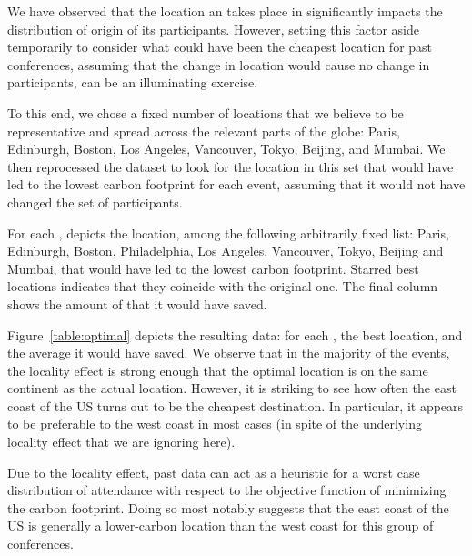 We have observed that the location an \event takes place in significantly
impacts the distribution of origin of its participants. However, setting
this factor aside temporarily to consider what could have been the cheapest
location for past conferences, assuming that the change in location would
cause no change in participants, can be an illuminating exercise.

To this end, we chose a fixed number of locations that we believe to be
representative and spread across the relevant parts of the globe: Paris,
Edinburgh, Boston, Los Angeles, Vancouver, Tokyo, Beijing, and Mumbai. We
then reprocessed the dataset to look for the location in this set that would
have led to the lowest carbon footprint for each event, assuming that it
would not have changed the set of participants.

\begin{table}
    \centering
  \caption{For each \event, depicts the location, among the following arbitrarily fixed list:
    Paris, Edinburgh, Boston, Philadelphia, Los Angeles, Vancouver, Tokyo, Beijing and Mumbai,
    that would have led to the lowest carbon footprint.
    Starred best locations indicates that they coincide with the original one.
    The final column shows the amount
    of \gazunitbis that it would have saved. 
  }
  \label{table:optimal}
\end{table}

Figure~\ref{table:optimal} depicts the resulting data: for each \event, the
best location, and the average \gazunitbis{} it would have saved. We observe
that in the majority of the events, the locality effect is strong enough
that the optimal location is on the same continent as the actual
location. However, it is striking to see how often the east coast of the US
turns out to be the cheapest destination. In particular, it appears to be
preferable to the west coast in most cases (in spite of the underlying
locality effect that we are ignoring here).

\begin{obs}
Due to the locality effect, past data can act as a heuristic for a worst
case distribution of attendance with respect to the objective function of
minimizing the carbon footprint. Doing so most notably suggests that the
east coast of the US is generally a lower-carbon location than the west
coast for this group of conferences.
  \label{obs:optim}
\end{obs}
